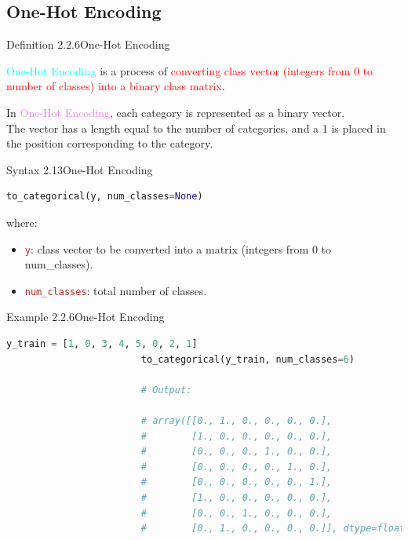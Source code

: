 \documentclass{book}
\begin{document}
\subsection{One-Hot Encoding}
\begin{defBox}{Definition 2.2.6}{One-Hot Encoding}
    \raggedright
    \textcolor{cyan}{One-Hot Encoding} is a process of \textcolor{red}{converting class vector (integers from 0 to number of classes) into a binary class matrix}.\\
\end{defBox}
In \textcolor{violet}{One-Hot Encoding}, each category is represented as a binary vector.\\
The vector has a length equal to the number of categories, and a 1 is placed in the position corresponding to the category.\\
\begin{synBox}{Syntax 2.13}{One-Hot Encoding}
    \begin{lstlisting}[language=Python, basicstyle=\ttfamily\small, keywordstyle=\color{blue}, commentstyle=\color{forestgreen}, stringstyle=\color{red},
    showstringspaces=false]
                                to_categorical(y, num_classes=None)
    \end{lstlisting}
    \raggedright
    where:\\
    \begin{itemize}
        \item \textcolor{brown}{\texttt{y}}: class vector to be converted into a matrix (integers from 0 to num\_classes).
        \item \textcolor{brown}{\texttt{num\_classes}}: total number of classes.
    \end{itemize}
\end{synBox}
\begin{egBox}{Example 2.2.6}{One-Hot Encoding}
    \begin{lstlisting}[language=Python, basicstyle=\ttfamily\small, keywordstyle=\color{blue}, commentstyle=\color{forestgreen}, stringstyle=\color{red},
    showstringspaces=false]
                        y_train = [1, 0, 3, 4, 5, 0, 2, 1]
                        to_categorical(y_train, num_classes=6)

                        # Output:

                        # array([[0., 1., 0., 0., 0., 0.],
                        #        [1., 0., 0., 0., 0., 0.],
                        #        [0., 0., 0., 1., 0., 0.],
                        #        [0., 0., 0., 0., 1., 0.],
                        #        [0., 0., 0., 0., 0., 1.],
                        #        [1., 0., 0., 0., 0., 0.],
                        #        [0., 0., 1., 0., 0., 0.],
                        #        [0., 1., 0., 0., 0., 0.]], dtype=float32)
    \end{lstlisting}
\end{egBox}
\end{document}

